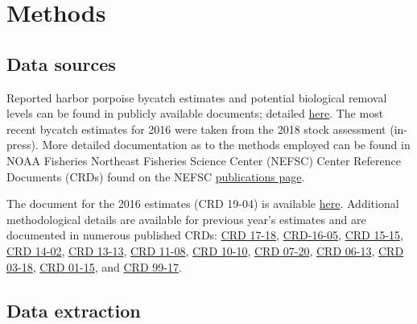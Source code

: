 \documentclass[
]{book}
\begin{document}
\hypertarget{methods-16}{%
\section{Methods}\label{methods-16}}

\hypertarget{data-sources-16}{%
\subsection{Data sources}\label{data-sources-16}}

Reported harbor porpoise bycatch estimates and potential biological removal levels can be found in publicly available documents; detailed \href{https://www.fisheries.noaa.gov/national/marine-mammal-protection/marine-mammal-stock-assessment-reports-region}{here}. The most recent bycatch estimates for 2016 were taken from the 2018 stock assessment (in-press). More detailed documentation as to the methods employed can be found in NOAA Fisheries Northeast Fisheries Science Center (NEFSC) Center Reference Documents (CRDs) found on the NEFSC \href{https://www.nefsc.noaa.gov/publications/crd/}{publications page}.

The document for the 2016 estimates (CRD 19-04) is available \href{https://www.nefsc.noaa.gov/publications/crd/crd1904/crd1904.pdf}{here}. Additional methodological details are available for previous year's estimates and are documented in numerous published CRDs: \href{https://www.nefsc.noaa.gov/publications/crd/crd1718/crd1718.pdf}{CRD 17-18}, \href{https://www.nefsc.noaa.gov/publications/crd/crd1605/crd1605.pdf}{CRD-16-05}, \href{https://www.nefsc.noaa.gov/publications/crd/crd1515/crd1515.pdf}{CRD 15-15}, \href{https://repository.library.noaa.gov/view/noaa/4718}{CRD 14-02}, \href{https://www.nefsc.noaa.gov/publications/crd/crd1313/crd1313_2nd_ed.pdf}{CRD 13-13}, \href{https://www.nefsc.noaa.gov/publications/crd/crd1108/1108.pdf}{CRD 11-08}, \href{https://www.nefsc.noaa.gov/publications/crd/crd1010/crd1010.pdf}{CRD 10-10}, \href{https://www.nefsc.noaa.gov/publications/crd/crd0720/crd0720.pdf}{CRD 07-20}, \href{https://www.nefsc.noaa.gov/publications/crd/crd0613/crd0613.pdf}{CRD 06-13}, \href{https://www.nefsc.noaa.gov/publications/crd/crd0318/crd0318.pdf}{CRD 03-18}, \href{https://www.nefsc.noaa.gov/publications/crd/crd0115/0115.pdf}{CRD 01-15}, and \href{https://www.nefsc.noaa.gov/publications/crd/pdfs/crd9917.pdf}{CRD 99-17}.

\hypertarget{data-extraction-14}{%
\subsection{Data extraction}\label{data-extraction-14}}
\end{document}
